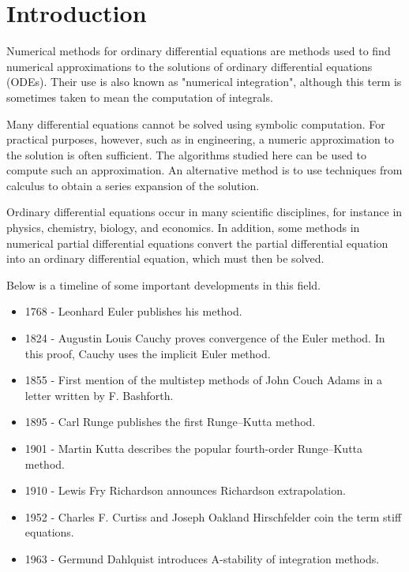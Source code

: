 \documentclass[preprint,12pt]{elsarticle}
\begin{document}

\section{Introduction}
\label{S:1}

Numerical methods for ordinary differential equations are methods used to find numerical approximations to the solutions of ordinary differential equations (ODEs). Their use is also known as "numerical integration", although this term is sometimes taken to mean the computation of integrals.

Many differential equations cannot be solved using symbolic computation. For practical purposes, however, such as in engineering, a numeric approximation to the solution is often sufficient. The algorithms studied here can be used to compute such an approximation. An alternative method is to use techniques from calculus to obtain a series expansion of the solution.

Ordinary differential equations occur in many scientific disciplines, for instance in physics, chemistry, biology, and economics. In addition, some methods in numerical partial differential equations convert the partial differential equation into an ordinary differential equation, which must then be solved.

Below is a timeline of some important developments in this field.

\begin{itemize}
  \item 1768 - Leonhard Euler publishes his method.
  \item 1824 - Augustin Louis Cauchy proves convergence of the Euler method. In this proof, Cauchy uses the implicit Euler method.
  \item 1855 - First mention of the multistep methods of John Couch Adams in a letter written by F. Bashforth.
  \item 1895 - Carl Runge publishes the first Runge–Kutta method.
  \item 1901 - Martin Kutta describes the popular fourth-order Runge–Kutta method.
  \item 1910 - Lewis Fry Richardson announces Richardson extrapolation.
  \item 1952 - Charles F. Curtiss and Joseph Oakland Hirschfelder coin the term stiff equations.
  \item 1963 - Germund Dahlquist introduces A-stability of integration methods.
\end{itemize}
\end{document}
